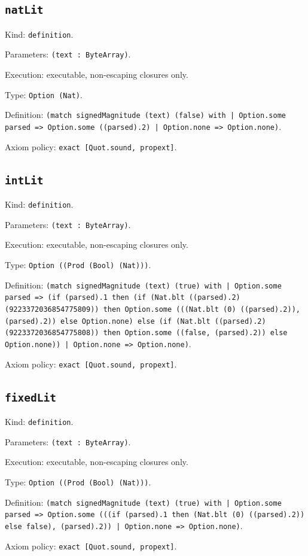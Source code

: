 \documentclass[11pt]{article}
\begin{document}
\subsection*{\texttt{natLit}}
\noindent Kind: \texttt{definition}.\par
\noindent Parameters: \texttt{(text : ByteArray)}.\par
\noindent Execution: executable, non-escaping closures only.\par
\noindent Type: \texttt{Option (Nat)}.\par
\noindent Definition: \texttt{(match signedMagnitude (text) (false) with | Option.some parsed => Option.some ((parsed).2) | Option.none => Option.none)}.\par
\noindent Axiom policy: \texttt{exact [Quot.sound, propext]}.\par
\subsection*{\texttt{intLit}}
\noindent Kind: \texttt{definition}.\par
\noindent Parameters: \texttt{(text : ByteArray)}.\par
\noindent Execution: executable, non-escaping closures only.\par
\noindent Type: \texttt{Option ((Prod (Bool) (Nat)))}.\par
\noindent Definition: \texttt{(match signedMagnitude (text) (true) with | Option.some parsed => (if (parsed).1 then (if (Nat.blt ((parsed).2) (9223372036854775809)) then Option.some (((Nat.blt (0) ((parsed).2)), (parsed).2)) else Option.none) else (if (Nat.blt ((parsed).2) (9223372036854775808)) then Option.some ((false, (parsed).2)) else Option.none)) | Option.none => Option.none)}.\par
\noindent Axiom policy: \texttt{exact [Quot.sound, propext]}.\par
\subsection*{\texttt{fixedLit}}
\noindent Kind: \texttt{definition}.\par
\noindent Parameters: \texttt{(text : ByteArray)}.\par
\noindent Execution: executable, non-escaping closures only.\par
\noindent Type: \texttt{Option ((Prod (Bool) (Nat)))}.\par
\noindent Definition: \texttt{(match signedMagnitude (text) (true) with | Option.some parsed => Option.some (((if (parsed).1 then (Nat.blt (0) ((parsed).2)) else false), (parsed).2)) | Option.none => Option.none)}.\par
\noindent Axiom policy: \texttt{exact [Quot.sound, propext]}.\par
\end{document}
